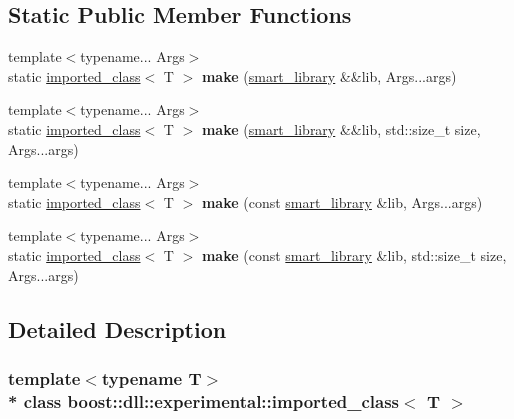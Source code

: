 \subsection*{Static Public Member Functions}
\begin{DoxyCompactItemize}
\item 
{\footnotesize template$<$typename... Args$>$ }\\static \hyperlink{a00155}{imported\+\_\+class}$<$ T $>$ {\bfseries make} (\hyperlink{a00281}{smart\+\_\+library} \&\&lib, Args...\+args)\hypertarget{a00155_a126a35bd88a98508ce4fa80d95740b4b}{}\label{a00155_a126a35bd88a98508ce4fa80d95740b4b}

\item 
{\footnotesize template$<$typename... Args$>$ }\\static \hyperlink{a00155}{imported\+\_\+class}$<$ T $>$ {\bfseries make} (\hyperlink{a00281}{smart\+\_\+library} \&\&lib, std\+::size\+\_\+t size, Args...\+args)\hypertarget{a00155_a3a674f8d3cfe52cc2c72711a9d25cf3f}{}\label{a00155_a3a674f8d3cfe52cc2c72711a9d25cf3f}

\item 
{\footnotesize template$<$typename... Args$>$ }\\static \hyperlink{a00155}{imported\+\_\+class}$<$ T $>$ {\bfseries make} (const \hyperlink{a00281}{smart\+\_\+library} \&lib, Args...\+args)\hypertarget{a00155_a2972dcd73fa59f34036a7be310164e64}{}\label{a00155_a2972dcd73fa59f34036a7be310164e64}

\item 
{\footnotesize template$<$typename... Args$>$ }\\static \hyperlink{a00155}{imported\+\_\+class}$<$ T $>$ {\bfseries make} (const \hyperlink{a00281}{smart\+\_\+library} \&lib, std\+::size\+\_\+t size, Args...\+args)\hypertarget{a00155_ae344352c615aeb5c3bc38c2c37b3cbe8}{}\label{a00155_ae344352c615aeb5c3bc38c2c37b3cbe8}

\end{DoxyCompactItemize}


\subsection{Detailed Description}
\subsubsection*{template$<$typename T$>$\\*
class boost\+::dll\+::experimental\+::imported\+\_\+class$<$ T $>$}


